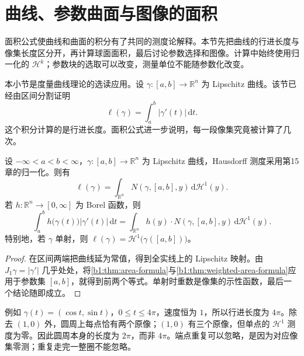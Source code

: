 \section{曲线、参数曲面与图像的面积}
\label{b1:sec:1704}

面积公式使曲线和曲面的积分有了共同的测度论解释。本节先把曲线的行进长度与像集长度区分开，再计算球面面积，最后讨论参数选择和图像。计算中始终使用归一化的 \(\mathcal H^k\)；参数块的选取可以改变，测量单位不能随参数化改变。



本小节是度量曲线理论的选读应用。设 \(\gamma:[a,b]\to\mathbb R^n\) 为 Lipschitz 曲线。该节已经由区间分割证明
\[
 \ell(\gamma)=\int_a^b|\gamma'(t)|\,\mathrm dt.
\]
这个积分计算的是行进长度。面积公式进一步说明，每一段像集究竟被计算了几次。

\begin{proposition}\label{b1:prop:curve-length-multiplicity}
设 \(-\infty<a<b<\infty\)，\(\gamma:[a,b]\to\mathbb R^n\) 为 Lipschitz 曲线，Hausdorff 测度采用第15章的归一化。则有
\[
 \ell(\gamma)
 =\int_{\mathbb R^n}N(\gamma,[a,b],y)\,
       \mathrm d\mathcal H^1(y).
\]
若 \(h:\mathbb R^n\to[0,\infty]\) 为 Borel 函数，则
\[
 \int_a^b h\bigl(\gamma(t)\bigr)|\gamma'(t)|\,\mathrm dt
 =\int_{\mathbb R^n}h(y)\cdot N(\gamma,[a,b],y)\,
       \mathrm d\mathcal H^1(y).
\]
特别地，若 \(\gamma\) 单射，则 \(\ell(\gamma)=\mathcal H^1\bigl(\gamma([a,b])\bigr)\)。
\end{proposition}
\begin{proof}
在区间两端把曲线延为常值，得到全实线上的 Lipschitz 映射。由 \(J_1\gamma=|\gamma'|\) 几乎处处，将\cref{b1:thm:area-formula}与\cref{b1:thm:weighted-area-formula}应用于参数集 \([a,b]\)，就得到前两个等式。单射时重数是像集的示性函数，最后一个结论随即成立。
\end{proof}

例如 \(\gamma(t)=(\cos t,\sin t)\)，\(0\leq t\leq4\pi\)，速度恒为 \(1\)，所以行进长度为 \(4\pi\)。除去 \((1,0)\) 外，圆周上每点恰有两个原像；\((1,0)\) 有三个原像，但单点的 \(\mathcal H^1\) 测度为零。因此圆周本身的长度为 \(2\pi\)，而非 \(4\pi\)。端点重复可以忽略，是因为对应像集零测；重复走完一整圈不能忽略。

